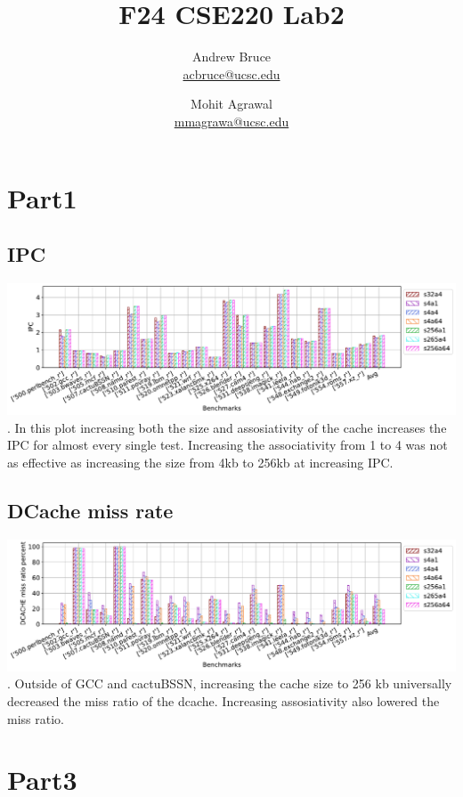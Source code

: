 \documentclass{article}
\title{F24 CSE220 Lab2}
\author{
  Andrew Bruce \\ \href{mailto:acbruce@ucsc.edu}{acbruce@ucsc.edu} \and
  Mohit Agrawal \\ \href{mailto:mmagrawa@ucsc.edu}{mmagrawa@ucsc.edu}
}
\begin{document}
\maketitle

\section*{Part1}
\subsection*{IPC}
\includegraphics[width=\textwidth]{Part1/IPC.pdf}.
In this plot increasing both the size and assosiativity of the cache increases the IPC for almost every single test. Increasing the associativity from 1 to 4 was not as effective as increasing the size from 4kb to 256kb at increasing IPC.
\subsection*{DCache miss rate}
\includegraphics[width=\textwidth]{Part1/DCACHE.pdf}.
Outside of GCC and cactuBSSN, increasing the cache size to 256 kb universally decreased the miss ratio of the dcache. Increasing assosiativity also lowered the miss ratio.
\section*{Part3}
\end{document}
